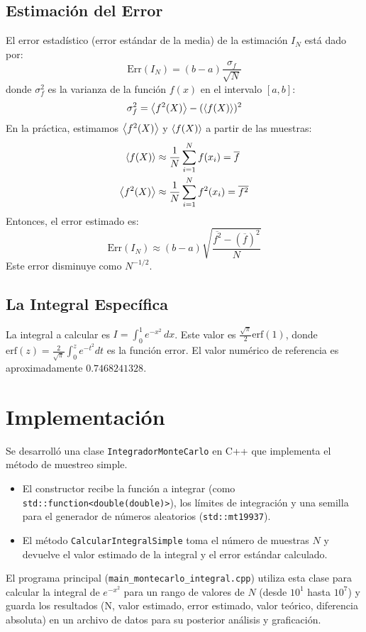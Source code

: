\documentclass[11pt,a4paper]{article}
\begin{document}
\subsection{Estimación del Error}
El error estadístico (error estándar de la media) de la estimación $I_N$ está dado por:
\begin{equation}
    \text{Err}(I_N) = (b-a) \frac{\sigma_f}{\sqrt{N}}
\end{equation}
donde $\sigma_f^2$ es la varianza de la función $f(x)$ en el intervalo $[a,b]$:
\begin{equation}
    \sigma_f^2 = \expval{f^2(X)} - (\expval{f(X)})^2
\end{equation}
En la práctica, estimamos $\expval{f^2(X)}$ y $\expval{f(X)}$ a partir de las muestras:
\begin{align}
    \expval{f(X)} &\approx \frac{1}{N} \sum_{i=1}^N f(x_i) = \overline{f} \\
    \expval{f^2(X)} &\approx \frac{1}{N} \sum_{i=1}^N f^2(x_i) = \overline{f^2}
\end{align}
Entonces, el error estimado es:
\begin{equation}
    \text{Err}(I_N) \approx (b-a) \sqrt{\frac{\overline{f^2} - (\overline{f})^2}{N}}
\end{equation}
Este error disminuye como $N^{-1/2}$.

\subsection{La Integral Específica}
La integral a calcular es $I = \displaystyle\int_0^1 e^{-x^2}\,dx$.
Este valor es $\frac{\sqrt{\pi}}{2}\text{erf}(1)$, donde $\text{erf}(z) = \frac{2}{\sqrt{\pi}}\int_0^z e^{-t^2}dt$ es la función error.
El valor numérico de referencia es aproximadamente $0.7468241328$.

\section{Implementación}
Se desarrolló una clase \texttt{IntegradorMonteCarlo} en C++ que implementa el método de muestreo simple.
\begin{itemize}
    \item El constructor recibe la función a integrar (como \texttt{std::function<double(double)>}), los límites de integración y una semilla para el generador de números aleatorios (\texttt{std::mt19937}).
    \item El método \texttt{CalcularIntegralSimple} toma el número de muestras $N$ y devuelve el valor estimado de la integral y el error estándar calculado.
\end{itemize}
El programa principal (\texttt{main\_montecarlo\_integral.cpp}) utiliza esta clase para calcular la integral de $e^{-x^2}$ para un rango de valores de $N$ (desde $10^1$ hasta $10^7$) y guarda los resultados (N, valor estimado, error estimado, valor teórico, diferencia absoluta) en un archivo de datos para su posterior análisis y graficación.
\end{document}
